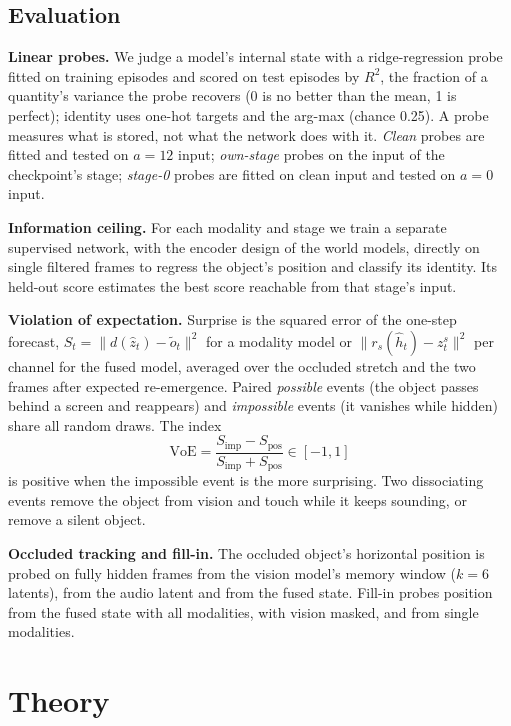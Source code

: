 \documentclass{article}
\theoremstyle{plain}
\theoremstyle{remark}
\begin{document}
\subsection{Evaluation}

\textbf{Linear probes.} We judge a model's internal state with a ridge-regression probe fitted on training episodes and scored on test episodes by \(R^2\), the fraction of a quantity's variance the probe recovers (0 is no better than the mean, 1 is perfect); identity uses one-hot targets and the arg-max (chance 0.25). A probe measures what is stored, not what the network does with it. \emph{Clean} probes are fitted and tested on \(a=12\) input; \emph{own-stage} probes on the input of the checkpoint's stage; \emph{stage-0} probes are fitted on clean input and tested on \(a=0\) input.

\textbf{Information ceiling.} For each modality and stage we train a separate supervised network, with the encoder design of the world models, directly on single filtered frames to regress the object's position and classify its identity. Its held-out score estimates the best score reachable from that stage's input.

\textbf{Violation of expectation.} Surprise is the squared error of the one-step forecast, \(S_t=\lVert d(\hat z_t)-\tilde o_t\rVert^2\) for a modality model or \(\lVert r_s(\hat h_t)-z^s_t\rVert^2\) per channel for the fused model, averaged over the occluded stretch and the two frames after expected re-emergence. Paired \emph{possible} events (the object passes behind a screen and reappears) and \emph{impossible} events (it vanishes while hidden) share all random draws. The index
\begin{equation}\mathrm{VoE}=\frac{S_{\text{imp}}-S_{\text{pos}}}{S_{\text{imp}}+S_{\text{pos}}}\in[-1,1]\label{eq:voe}\end{equation}
is positive when the impossible event is the more surprising. Two dissociating events remove the object from vision and touch while it keeps sounding, or remove a silent object.

\textbf{Occluded tracking and fill-in.} The occluded object's horizontal position is probed on fully hidden frames from the vision model's memory window (\(k=6\) latents), from the audio latent and from the fused state. Fill-in probes position from the fused state with all modalities, with vision masked, and from single modalities.

\section{Theory}
\label{sec:theory}
\end{document}
